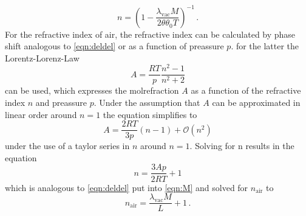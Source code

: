 \begin{equation}
    \label{eqn:glassn}
    n = \left( 1 - \frac{\lambda_\text{vac} M }{2 \theta \theta_0 T} \right)^{-1} \, .
\end{equation}
For the refractive index of air, the refractive index can be calculated by phase shift analogous to \autoref{eqn:deldel} or as a function of preassure $p$.
for the latter the Lorentz-Lorenz-Law 
\begin{equation}
    A = \frac{RT}{p} \frac{n^2-1}{n^2+2}
\end{equation}
can be used, which expresses the molrefraction $A$ as a function of the refractive index $n$ and preassure $p$.
Under the assumption that $A$ can be approximated in linear order around $n = 1$ the equation simplifies to
\begin{equation}
    A = \frac{2RT}{3p} \left(n-1\right) + \mathcal{O}\left( n^2 \right)
\end{equation}
under the use of a taylor series in $n$ around $n =1 $.
Solving for n results in the equation
\begin{equation}
    \label{eqn:lorentz_lorenz}
    n = \frac{3Ap}{2RT} + 1
\end{equation}
which is analogous to \autoref{eqn:deldel} put into \autoref{eqn:M} and solved for $n_\text{air}$ to
\begin{equation}
    \label{eqn:refractive_index_air}
    n_\text{air} = \frac{\lambda_\text{vac} M}{L} + 1 \, .
\end{equation}
\newpage
